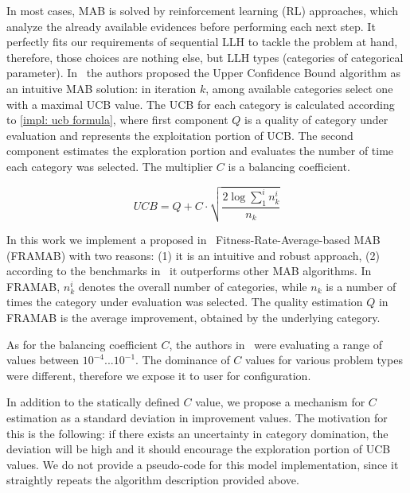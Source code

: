 In most cases, MAB is solved by reinforcement learning (RL) approaches, which analyze the already available evidences before performing each next step. It perfectly fits our requirements of sequential LLH to tackle the problem at hand, therefore, those choices are nothing else, but LLH types (categories of categorical parameter). In~\cite{auer2002finite} the authors proposed the Upper Confidence Bound algorithm as an intuitive MAB solution: in iteration $k$, among available categories select one with a maximal UCB value. The UCB for each category is calculated according to \cref{impl: ucb formula}, where first component $Q$ is a quality of category under evaluation and represents the exploitation portion of UCB. The second component estimates the exploration portion and evaluates the number of time each category was selected. The multiplier $C$ is a balancing coefficient.

\begin{equation}
UCB = Q + C \cdot \sqrt{\frac{2 \log \sum_{1}^{i} n_k^i}{n_k}}
\label{impl: ucb formula}
\end{equation}

In this work we implement a proposed in~\cite{li2013adaptive} Fitness-Rate-Average-based MAB (FRAMAB) with two reasons: (1) it is an intuitive and robust approach, (2) according to the benchmarks in~\cite{ferreira2017multi} it outperforms other MAB algorithms. In FRAMAB, $n_k^i$ denotes the overall number of categories, while $n_k$ is a number of times the category under evaluation was selected. The quality estimation $Q$ in FRAMAB is the average improvement, obtained by the underlying category.

As for the balancing coefficient $C$, the authors in~\cite{ferreira2017multi} were evaluating a range of values between $10^{-4}...10^{-1}$. The dominance of $C$ values for various problem types were different, therefore we expose it to user for configuration. 

In addition to the statically defined $C$ value, we propose a mechanism for $C$ estimation as a standard deviation in improvement values. The motivation for this is the following: if there exists an uncertainty in category domination, the deviation will be high and it should encourage the exploration portion of UCB values. We do not provide a pseudo-code for this model implementation, since it straightly repeats the algorithm description provided above.


